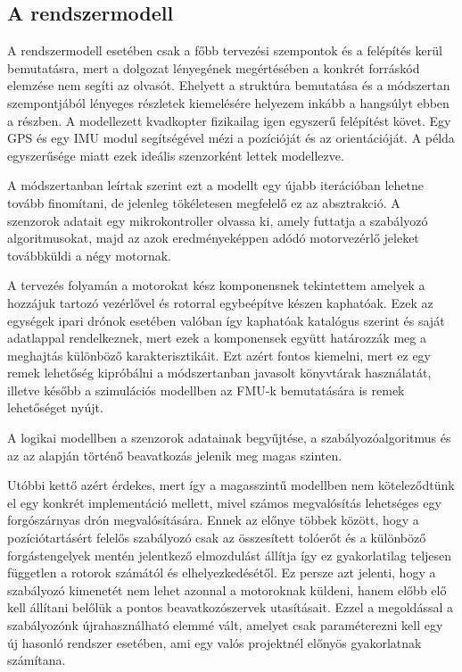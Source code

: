     \subsection{A rendszermodell}
    A rendszermodell esetében csak a főbb tervezési szempontok és a felépítés kerül bemutatásra, mert a dolgozat lényegének megértésében a konkrét forráskód elemzése nem segíti az olvasót. Ehelyett a struktúra bemutatása és a módszertan szempontjából lényeges részletek kiemelésére helyezem inkább a hangsúlyt ebben a részben.
    A modellezett kvadkopter fizikailag igen egyszerű felépítést követ. Egy GPS és egy IMU modul segítségével mézi a pozícióját és az orientációját. A példa egyszerűsége miatt ezek ideális szenzorként lettek modellezve.
    
    A módszertanban leírtak szerint ezt a modellt egy újabb iterációban lehetne tovább finomítani, de jelenleg tökéletesen megfelelő ez az absztrakció.
    A szenzorok adatait egy mikrokontroller olvassa ki, amely futtatja a szabályozó algoritmusokat, majd az azok eredményeképpen adódó motorvezérlő jeleket továbbküldi a négy motornak.
    
    A tervezés folyamán a motorokat kész komponensnek tekintettem amelyek a hozzájuk tartozó vezérlővel és rotorral egybeépítve készen kaphatóak. Ezek az egységek ipari drónok esetében valóban így kaphatóak katalógus szerint és saját adatlappal rendelkeznek, mert ezek a komponensek együtt határozzák meg a meghajtás különböző karakterisztikáit.
    Ezt azért fontos kiemelni, mert ez egy remek lehetőség kipróbálni a módszertanban javasolt könyvtárak használatát, illetve később a szimulációs modellben az FMU-k bemutatására is remek lehetőséget nyújt.
    
    A logikai modellben a szenzorok adatainak begyűjtése, a szabályozóalgoritmus és az az alapján történő beavatkozás jelenik meg magas szinten.
    
    Utóbbi kettő azért érdekes, mert így a magasszintű modellben nem köteleződtünk el egy konkrét implementáció mellett, mivel számos megvalósítás lehetséges egy forgószárnyas drón megvalósítására. Ennek az előnye többek között, hogy a pozíciótartásért felelős szabályozó csak az összesített tolóerőt és a különböző forgástengelyek mentén jelentkező elmozdulást állítja így ez gyakorlatilag teljesen független a rotorok számától és elhelyezkedésétől.
    Ez persze azt jelenti, hogy a szabályozó kimenetét nem lehet azonnal a motoroknak küldeni, hanem előbb elő kell állítani belőlük a pontos beavatkozószervek utasításait. Ezzel a megoldással a szabályozónk újrahasználható elemmé vált, amelyet csak paraméterezni kell egy új hasonló rendszer esetében, ami egy valós projektnél előnyös gyakorlatnak számítana.
    
